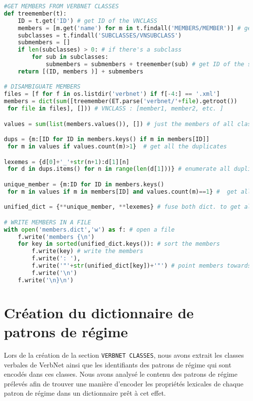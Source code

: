 \begin{lstlisting}[language=Python, caption = Ajout des membres de VerbNet, label=scriptmember]
#GET MEMBERS FROM VERBNET CLASSES
def treemember(t):
    ID = t.get('ID') # get ID of the VNCLASS
    members = [m.get('name') for m in t.findall('MEMBERS/MEMBER')] # get members 
    subclasses = t.findall('SUBCLASSES/VNSUBCLASS')
    submembers = []
    if len(subclasses) > 0: # if there's a subclass
        for sub in subclasses:
            submembers = submembers + treemember(sub) # get ID of the subclass and members
    return [(ID, members )] + submembers

# DISAMBIGUATE MEMBERS
files = [f for f in os.listdir('verbnet') if f[-4:] == '.xml']
members = dict(sum([treemember(ET.parse('verbnet/'+file).getroot())
 for file in files], [])) # VNCLASS : [member1, member2, etc. ]

values = sum(list(members.values()), []) # just the members of all classes

dups = {m:[ID for ID in members.keys() if m in members[ID]]
 for m in values if values.count(m)>1}  # get all the duplicates

lexemes = {d[0]+'_'+str(n+1):d[1][n]
 for d in dups.items() for n in range(len(d[1]))} # enumerate all duplicates: eat_1, eat_2

unique_member = {m:ID for ID in members.keys() 
 for m in values if m in members[ID] and values.count(m)==1} #  get all unique lexemes

unified_dict = {**unique_member, **lexemes} # fuse both dict. to get all members disambiguated

# WRITE MEMBERS IN A FILE
with open('members.dict','w') as f: # open a file
    f.write('members {\n')
    for key in sorted(unified_dict.keys()): # sort the members
        f.write(key) # write the members
        f.write(': '),
        f.write('"'+str(unified_dict[key])+'"') # point members towards ID of VNCLASS
        f.write('\n')
    f.write('\n}\n')
\end{lstlisting}

\section{Création du dictionnaire de patrons de régime}

Lors de la création de la section \texttt{VERBNET CLASSES}, nous avons extrait les classes verbales de VerbNet ainsi que les identifiants des patrons de régime qui sont encodés dans ces classes. Nous avons analysé le contenu des patrons de régime prélevés afin de trouver une manière d'encoder les propriétés lexicales de chaque patron de régime dans un dictionnaire prêt à cet effet.

